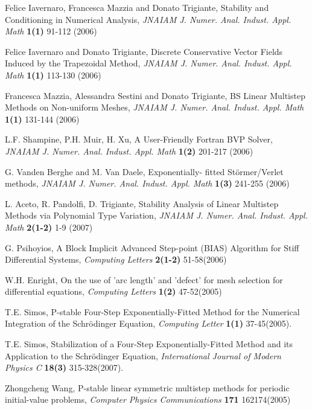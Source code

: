 \documentclass[numreferences]{kluwer}
\begin{document}
\begin{article}
\begin{thebibliography}{120}
Felice Iavernaro, Francesca Mazzia and Donato Trigiante, Stability
and Conditioning in Numerical Analysis, {\it JNAIAM J. Numer.
Anal. Indust. Appl. Math} {\bf 1(1)} 91-112 (2006)

Felice Iavernaro and Donato Trigiante, Discrete Conservative
Vector Fields Induced by the Trapezoidal Method, {\it JNAIAM J.
Numer. Anal. Indust. Appl. Math} {\bf 1(1)} 113-130 (2006)

Francesca Mazzia, Alessandra Sestini and Donato Trigiante, BS
Linear Multistep Methods on Non-uniform Meshes, {\it JNAIAM J.
Numer. Anal. Indust. Appl. Math} {\bf 1(1)} 131-144 (2006)

L.F. Shampine, P.H. Muir, H. Xu, A User-Friendly Fortran BVP
Solver, {\it JNAIAM J. Numer. Anal. Indust. Appl. Math} {\bf 1(2)}
201-217 (2006)

G. Vanden Berghe and M. Van Daele, Exponentially- fitted
Störmer/Verlet methods, {\it JNAIAM J. Numer. Anal. Indust. Appl.
Math} {\bf 1(3)} 241-255 (2006)

L. Aceto, R. Pandolfi, D. Trigiante, Stability Analysis of Linear
Multistep Methods via Polynomial Type Variation, {\it JNAIAM J.
Numer. Anal. Indust. Appl. Math} {\bf 2(1-2)} 1-9 (2007)

 G. Psihoyios, A Block Implicit Advanced Step-point (BIAS) Algorithm for Stiff Differential
Systems, {\it Computing Letters} {\bf 2(1-2)} 51-58(2006)

 W.H. Enright, On the use of 'arc length' and 'defect'
for mesh selection for differential equations, {\it Computing
Letters} {\bf 1(2)} 47-52(2005)

T.E. Simos, P-stable Four-Step Exponentially-Fitted Method for the
Numerical Integration of the Schr\"{o}dinger Equation, {\em
Computing Letter} \textbf{1(1)} 37-45(2005).

T.E. Simos, Stabilization of a Four-Step Exponentially-Fitted
Method and its Application to the Schr\"odinger Equation, {\em
International Journal of Modern Physics C} \textbf{18(3)}
315-328(2007).

Zhongcheng Wang, P-stable linear symmetric multistep methods for
periodic initial-value problems, {\em Computer Physics
Communications} \textbf{171} 162174(2005)


\end{thebibliography}
\end{article}
\end{document}
